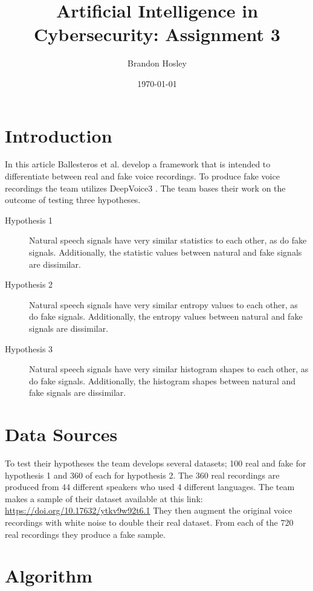 \documentclass[]{article}
\title{Artificial Intelligence in Cybersecurity: Assignment 3}
\author{Brandon Hosley}
\date{\today}
\begin{document}
	\maketitle
	
\section{Introduction}

In this article \cite{Ballesteros2021} Ballesteros et al. develop a framework that is intended to differentiate between real and fake voice recordings. 
To produce fake voice recordings the team utilizes DeepVoice3 \cite{Ping2018}.
The team bases their work on the outcome of testing three hypotheses.
\begin{description}
	\item[Hypothesis 1] 
		Natural speech signals have very similar statistics to each other, as do fake signals. Additionally, the statistic values between natural and fake signals are dissimilar.
	\item[Hypothesis 2]
		Natural speech signals have very similar entropy values to each other, as do fake signals. Additionally, the entropy values between natural and fake signals are dissimilar.
	\item[Hypothesis 3] 
		Natural speech signals have very similar histogram shapes to each other, as do fake signals. Additionally, the histogram shapes between natural and fake signals are dissimilar.
\end{description}

\section{Data Sources}

To test their hypotheses the team develops several datasets; 100 real and fake for hypothesis 1 and 360 of each for hypothesis 2. 
The 360 real recordings are produced from 44 different speakers who used 4 different languages.
The team makes a sample of their dataset available at this link: \\
\href{https://doi.org/10.17632/ytkv9w92t6.1}{https://doi.org/10.17632/ytkv9w92t6.1}
They then augment the original voice recordings with white noise to double their real dataset.
From each of the 720 real recordings they produce a fake sample.

\section{Algorithm}
\end{document}
